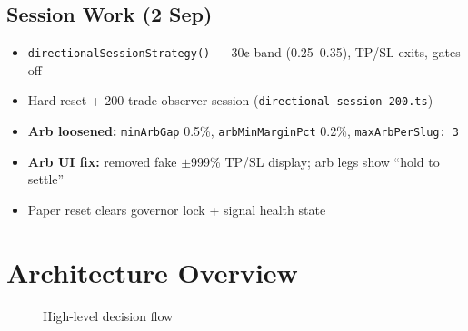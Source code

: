 \documentclass[11pt,a4paper]{article}
\begin{document}
\subsection{Session Work (2 Sep)}
\begin{itemize}[noitemsep]
  \item \texttt{directionalSessionStrategy()} --- 30¢ band (0.25--0.35), TP/SL exits, gates off
  \item Hard reset + 200-trade observer session (\texttt{directional-session-200.ts})
  \item \textbf{Arb loosened:} \texttt{minArbGap} 0.5\%, \texttt{arbMinMarginPct} 0.2\%, \texttt{maxArbPerSlug: 3}
  \item \textbf{Arb UI fix:} removed fake $\pm$999\% TP/SL display; arb legs show ``hold to settle''
  \item Paper reset clears governor lock + signal health state
\end{itemize}

\section{Architecture Overview}

\begin{figure}[h]
\centering
{}
\caption{High-level decision flow}
\end{figure}
\end{document}
